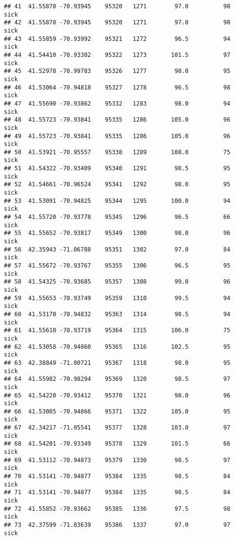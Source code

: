 \documentclass[
]{article}
\begin{document}
\begin{verbatim}
## 41  41.55878 -70.93945    95320   1271        97.0          98         sick
## 42  41.55878 -70.93945    95320   1271        97.0          98         sick
## 43  41.55859 -70.93992    95321   1272        96.5          94         sick
## 44  41.54410 -70.93302    95322   1273       101.5          97         sick
## 45  41.52978 -70.99783    95326   1277        98.0          95         sick
## 46  41.53064 -70.94818    95327   1278        96.5          98         sick
## 47  41.55690 -70.93862    95332   1283        98.0          94         sick
## 48  41.55723 -70.93841    95335   1286       105.0          96         sick
## 49  41.55723 -70.93841    95335   1286       105.0          96         sick
## 50  41.53921 -70.95557    95338   1289       108.0          75         sick
## 51  41.54322 -70.93409    95340   1291        98.5          95         sick
## 52  41.54661 -70.96524    95341   1292        98.0          95         sick
## 53  41.53091 -70.94825    95344   1295       100.0          94         sick
## 54  41.55720 -70.93778    95345   1296        96.5          66         sick
## 55  41.55652 -70.93817    95349   1300        98.0          96         sick
## 56  42.35943 -71.06788    95351   1302        97.0          84         sick
## 57  41.55672 -70.93767    95355   1306        96.5          95         sick
## 58  41.54325 -70.93685    95357   1308        99.0          96         sick
## 59  41.55653 -70.93749    95359   1310        99.5          94         sick
## 60  41.53170 -70.94832    95363   1314        98.5          94         sick
## 61  41.55610 -70.93719    95364   1315       106.0          75         sick
## 62  41.53058 -70.94860    95365   1316       102.5          95         sick
## 63  42.38849 -71.00721    95367   1318        98.0          95         sick
## 64  41.55982 -70.98294    95369   1320        98.5          97         sick
## 65  41.54220 -70.93412    95370   1321        98.0          96         sick
## 66  41.53085 -70.94866    95371   1322       105.0          95         sick
## 67  42.34217 -71.05541    95377   1328       103.0          97         sick
## 68  41.54201 -70.93349    95378   1329       101.5          66         sick
## 69  41.53112 -70.94873    95379   1330        98.5          97         sick
## 70  41.53141 -70.94877    95384   1335        98.5          84         sick
## 71  41.53141 -70.94877    95384   1335        98.5          84         sick
## 72  41.55852 -70.93662    95385   1336        97.5          98         sick
## 73  42.37599 -71.03639    95386   1337        97.0          97         sick

\end{verbatim}
\end{document}

